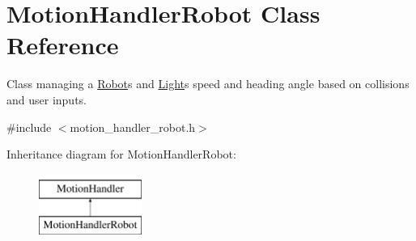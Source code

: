 \hypertarget{class_motion_handler_robot}{}\section{Motion\+Handler\+Robot Class Reference}
\label{class_motion_handler_robot}


Class managing a \hyperlink{class_robot}{Robot}\textquotesingle{}s and \hyperlink{class_light}{Light}\textquotesingle{}s speed and heading angle based on collisions and user inputs.  




{\ttfamily \#include $<$motion\+\_\+handler\+\_\+robot.\+h$>$}

Inheritance diagram for Motion\+Handler\+Robot\+:\begin{figure}[H]
\begin{center}
\leavevmode
\includegraphics[height=2.000000cm]{class_motion_handler_robot}
\end{center}
\end{figure}

